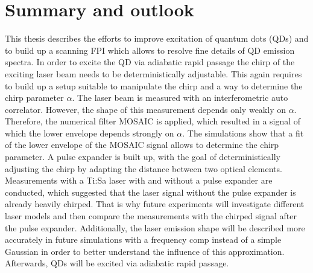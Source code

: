 \chapter{Summary and outlook}
\label{cha:summary}
This thesis describes the efforts to improve excitation of quantum dots (\ac{QD}s) and to build up a scanning \acl{FPI} which allows to resolve fine details of \ac{QD} emission spectra.
In order to excite the \ac{QD} via adiabatic rapid passage the chirp of the exciting laser beam needs to be deterministically adjustable.
This again requires to build up a setup suitable to manipulate the chirp and a way to determine the chirp parameter $\alpha$.
The laser beam is measured with an interferometric auto correlator.
However, the shape of this measurement depends only weakly on $\alpha$.
Therefore, the numerical filter \ac{MOSAIC} is applied, which resulted in a signal of which the lower envelope depends strongly on $\alpha$.
The simulations show that a fit of the lower envelope of the \ac{MOSAIC} signal allows to determine the chirp parameter.
A pulse expander is built up, with the goal of deterministically adjusting the chirp by adapting the distance between two optical elements.
Measurements with a Ti:Sa laser with and without a pulse expander are conducted, which suggested that the laser signal without the pulse expander is already heavily chirped.
That is why future experiments will investigate different laser models and then compare the measurements with the chirped signal after the pulse expander.
Additionally, the laser emission shape will be described more accurately in future simulations with a frequency comp instead of a simple Gaussian in order to better understand the influence of this approximation.
Afterwards, \acp{QD} will be excited via adiabatic rapid passage.


